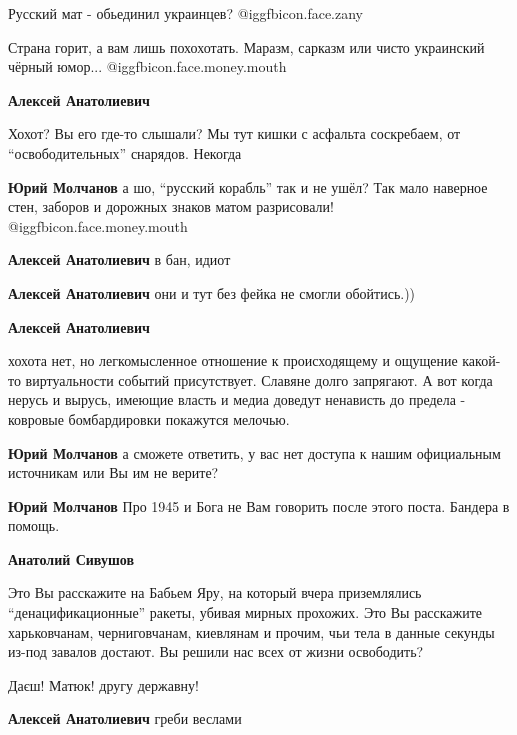 \begin{itemize}
\begin{itemize}
\end{itemize} %


Русский мат - обьединил украинцев? @igg{fbicon.face.zany} 

Страна горит, а вам лишь похохотать. Маразм, сарказм или чисто украинский
чёрный юмор... @igg{fbicon.face.money.mouth} 

\begin{itemize} %
\textbf{Алексей Анатолиевич} 

Хохот? Вы его где-то слышали? Мы тут кишки с асфальта соскребаем, от
\enquote{освободительных} снарядов. Некогда

\textbf{Юрий Молчанов} а шо, \enquote{русский корабль} так и не ушёл?
Так мало наверное стен, заборов и дорожных знаков матом разрисовали! @igg{fbicon.face.money.mouth} 

\textbf{Алексей Анатолиевич} в бан, идиот

\textbf{Алексей Анатолиевич} они и тут без фейка не смогли обойтись.))

\textbf{Алексей Анатолиевич} 

хохота нет, но легкомысленное отношение к происходящему и ощущение какой-то
виртуальности событий присутствует. Славяне долго запрягают. А вот когда нерусь
и вырусь, имеющие власть и медиа доведут ненависть до предела - ковровые
бомбардировки покажутся мелочью.

\textbf{Юрий Молчанов} а сможете ответить, у вас нет доступа к нашим официальным источникам или Вы им не верите?

\textbf{Юрий Молчанов} Про 1945 и Бога не Вам говорить после этого поста. Бандера в помощь.

\textbf{Анатолий Сивушов} 

Это Вы расскажите на Бабьем Яру, на который вчера приземлялись
\enquote{денацификационные} ракеты, убивая мирных прохожих. Это Вы расскажите
харьковчанам, черниговчанам, киевлянам и прочим, чьи тела в данные секунды
из-под завалов достают. Вы решили нас всех от жизни освободить?

Даєш! Матюк! другу державну!

\textbf{Алексей Анатолиевич} греби веслами
\end{itemize} %


\end{itemize}
